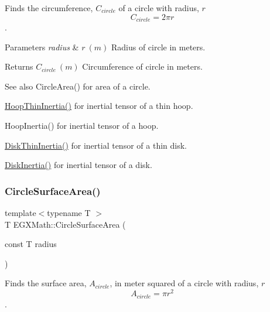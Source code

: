 Finds the circumference, $C_{circle}$ of a circle with radius, $r$ \[ C_{circle}=2 \pi r \]. 


\begin{DoxyParams}{Parameters}
{\em radius} & $ r\ (m)$ Radius of circle in meters. \\
\hline
\end{DoxyParams}
\begin{DoxyReturn}{Returns}
$ C_{circle}\ (m)$ Circumference of circle in meters. 
\end{DoxyReturn}
\begin{DoxySeeAlso}{See also}
Circle\+Area() for area of a circle. 

\mbox{\hyperlink{group___e_g_x_math-_geometry-3_d-_hoop_gab3a84dc2aa29ce0db990425747d291c6}{Hoop\+Thin\+Inertia()}} for inertial tensor of a thin hoop. 

Hoop\+Inertia() for inertial tensor of a hoop. 

\mbox{\hyperlink{group___e_g_x_math-_geometry-3_d-_disk_ga8dcadf6cd5680294a84311c6767e3caf}{Disk\+Thin\+Inertia()}} for inertial tensor of a thin disk. 

\mbox{\hyperlink{group___e_g_x_math-_geometry-3_d-_disk_ga6ed461694b277e36a641a6550bdea68f}{Disk\+Inertia()}} for inertial tensor of a disk. 
\end{DoxySeeAlso}
\mbox{\label{group___e_g_x_math-_geometry-2_d-_circle_gaa4486100a643c57bd7a80c1c11ae3f60}} 
\subsubsection{\texorpdfstring{Circle\+Surface\+Area()}{CircleSurfaceArea()}}
{\footnotesize\ttfamily template$<$typename T $>$ \\
T E\+G\+X\+Math\+::\+Circle\+Surface\+Area (\begin{DoxyParamCaption}\item[{const T}]{radius }\end{DoxyParamCaption})}



Finds the surface area, $A_{circle}$, in meter squared of a circle with radius, $r$ \[ A_{circle}=\pi r^2 \]. 


